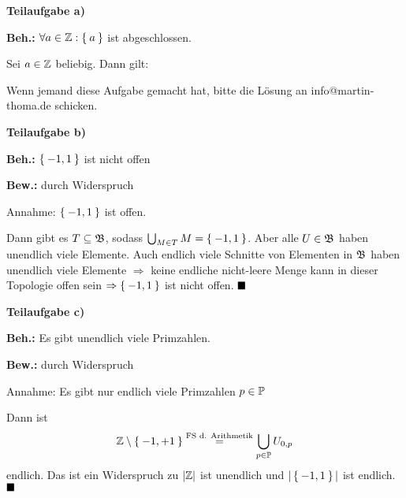 \begin{solution}[\ref{ub1:aufg4}]
    \textbf{Teilaufgabe a)} 

    \textbf{Beh.:}  $\forall a \in \mathbb{Z}: \Set{a}$ ist abgeschlossen.

    Sei $a \in \mathbb{Z}$ beliebig. Dann gilt:

    Wenn jemand diese Aufgabe gemacht hat, bitte die Lösung an info@martin-thoma.de
    schicken.%

    \textbf{Teilaufgabe b)} 

    \textbf{Beh.:} $\Set{-1, 1}$ ist nicht offen

    \textbf{Bew.:} durch Widerspruch

    Annahme: $\Set{-1, 1}$ ist offen.

    Dann gibt es $T \subseteq \mathfrak{B}$, sodass $\bigcup_{M \in T} M = \Set{-1, 1}$.
    Aber alle $U \in \mathfrak{B}$ haben unendlich viele Elemente. Auch endlich
    viele Schnitte von Elementen in $\mathfrak{B}$ haben unendlich viele
    Elemente $\Rightarrow$ keine endliche nicht-leere Menge kann
    in dieser Topologie offen sein $\Rightarrow \Set{-1,1}$ ist
    nicht offen. $\qed$

    \textbf{Teilaufgabe c)} 

    \textbf{Beh.:} Es gibt unendlich viele Primzahlen.

    \textbf{Bew.:} durch Widerspruch

    Annahme:  Es gibt nur endlich viele Primzahlen $p \in \mathbb{P}$

    Dann ist 
    \[\mathbb{Z} \setminus \Set{-1, +1} \overset{\text{FS d. Arithmetik}}= \bigcup_{p \in \mathbb{P}} U_{0,p}\]
    endlich. Das ist ein Widerspruch zu $|\mathbb{Z}|$ ist unendlich und
    $|\Set{-1,1}|$ ist endlich. $\qed$
\end{solution}

